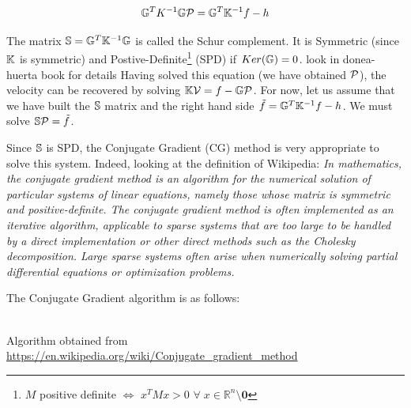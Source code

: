 \begin{mdframed}[backgroundcolor=blue!5]
\[
{\mathbb{G}}^T K^{-1} {\mathbb{G}} {\cal P} = {\mathbb{G}}^T {\mathbb{K}}^{-1} f - h 
\]
\end{mdframed}
The matrix ${\mathbb{S}}= {\mathbb{G}}^T {\mathbb{K}}^{-1} {\mathbb{G}} $ is called the Schur complement.  
It is Symmetric (since ${\mathbb{K}}$ is symmetric) and  Postive-Definite\footnote{$M$ 
positive definite $\iff$ $x^TMx>0$ $\forall \; x\in \mathbb{R}^n \setminus {\bm 0}$ }
(SPD)  if $Ker({{\mathbb{G}}})=0$. 
{\color{red} look in donea-huerta book for details}
Having solved this equation (we have obtained ${\cal P}$), the velocity can be recovered by solving 
${\mathbb{K}} {\cal V} =f- {\mathbb{G}} {\cal P}$. 
For now, let us assume that we have built the ${\mathbb{S}}$ matrix and the right hand side $\tilde{f}={\mathbb{G}}^T {\mathbb{K}}^{-1} f - h$.
We must solve ${\mathbb{S}} {\cal P} = \tilde{f}$.

 
Since ${\mathbb{S}}$ is SPD, the Conjugate Gradient (CG) method is very appropriate to solve this system. 
Indeed, looking at the definition of Wikipedia: {\it In mathematics, the conjugate gradient method is an algorithm for the numerical solution of particular systems of linear equations, namely those whose matrix is symmetric and positive-definite. The conjugate gradient method is often implemented as an iterative algorithm, applicable to sparse systems that are too large to be handled by a direct implementation or other direct methods such as the Cholesky decomposition. Large sparse systems often arise when numerically solving partial differential equations or optimization problems.}

The Conjugate Gradient algorithm is as follows:
\begin{center}
\\
Algorithm obtained from \url{https://en.wikipedia.org/wiki/Conjugate\_gradient\_method}
\end{center}

